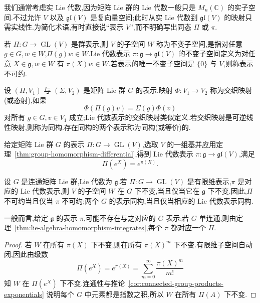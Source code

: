 {我们通常考虑实 Lie 代数,因为矩阵 Lie 群的 Lie 代数一般只是 $M_n(\mathbb C)$ 的实子空间.不过允许 $V$ 以及 $\mathfrak{gl}(V)$ 是复向量空间;此时从实 Lie 代数到 $\mathfrak{gl}(V)$ 的映射只需实线性.为简化术语,有时直接说“表示 $V$”,而不明确写出同态 $\Pi$ 或 $\pi$.

\begin{definition}[不变子空间与不可约表示]\label{def:invariant-irreducible-representation}
若 $\Pi:G\to\operatorname{GL}(V)$ 是群表示,则 $V$ 的子空间 $W$ 称为不变子空间,是指对任意 $g\in G,w\in W$,$\Pi(g)w\in W$.Lie 代数表示 $\pi:\mathfrak g\to\mathfrak{gl}(V)$ 的不变子空间定义为对任意 $X\in\mathfrak g,w\in W$ 有 $\pi(X)w\in W$.若表示的唯一不变子空间是 $\{0\}$ 与 $V$,则称表示不可约.
\end{definition}

\begin{definition}[交织映射与表示同构]\label{def:intertwining-map}
设 $(\Pi,V_1)$ 与 $(\Sigma,V_2)$ 是矩阵 Lie 群 $G$ 的表示.映射 $\Phi:V_1\to V_2$ 称为交织映射(或态射),如果
\[
\Phi(\Pi(g)v)=\Sigma(g)\Phi(v)
\]
对所有 $g\in G,v\in V_1$ 成立;Lie 代数表示的交织映射类似定义.若交织映射是可逆线性映射,则称为同构.存在同构的两个表示称为同构(或等价)的.
\end{definition}

给定矩阵 Lie 群 $G$ 的表示 $\Pi:G\to\operatorname{GL}(V)$,选取 $V$ 的一组基并应用定理~\ref{thm:group-homomorphism-differential},得到 Lie 代数表示 $\pi:\mathfrak g\to\mathfrak{gl}(V)$,满足
\[
\Pi(e^X)=e^{\pi(X)}.
\label{eq:group-lie-representation-exponential}
\]

\begin{proposition}\label{prop:group-lie-invariant-subspaces}
设 $G$ 是连通矩阵 Lie 群,Lie 代数为 $\mathfrak g$.若 $\Pi:G\to\operatorname{GL}(V)$ 是有限维表示,$\pi$ 是对应的 Lie 代数表示,则 $V$ 的子空间 $W$ 在 $G$ 下不变,当且仅当它在 $\mathfrak g$ 下不变.因此,$\Pi$ 不可约当且仅当 $\pi$ 不可约;两个 $G$ 的表示同构,当且仅当相应的 Lie 代数表示同构.
\end{proposition}

一般而言,给定 $\mathfrak g$ 的表示 $\pi$,可能不存在与之对应的 $G$ 表示;若 $G$ 单连通,则由定理~\ref{thm:lie-algebra-homomorphism-integrates},每个 $\pi$ 都对应一个 $\Pi$.

\begin{proof}
若 $W$ 在所有 $\pi(X)$ 下不变,则在所有 $\pi(X)^m$ 下不变.有限维子空间自动闭,因此由级数
\[
\Pi(e^X)=e^{\pi(X)}=\sum_{m=0}^{\infty}\frac{\pi(X)^m}{m!}
\]
知 $W$ 在 $\Pi(e^X)$ 下不变.连通性与推论~\ref{cor:connected-group-products-exponentials} 说明每个 $G$ 中元素都是指数之积,所以 $W$ 在所有 $\Pi(A)$ 下不变.


\end{proof}}
